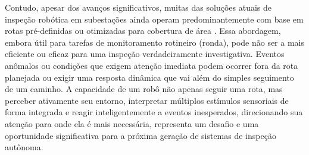 Contudo, apesar dos avanços significativos, muitas das soluções atuais de inspeção robótica em subestações ainda operam predominantemente com base em rotas pré-definidas ou otimizadas para cobertura de área \cite{TJH2b2023Trends}. Essa abordagem, embora útil para tarefas de monitoramento rotineiro (ronda), pode não ser a mais eficiente ou eficaz para uma inspeção verdadeiramente investigativa. Eventos anômalos ou condições que exigem atenção imediata podem ocorrer fora da rota planejada ou exigir uma resposta dinâmica que vai além do simples seguimento de um caminho. A capacidade de um robô não apenas seguir uma rota, mas perceber ativamente seu entorno, interpretar múltiplos estímulos sensoriais de forma integrada e reagir inteligentemente a eventos inesperados, direcionando sua atenção para onde ela é mais necessária, representa um desafio e uma oportunidade significativa para a próxima geração de sistemas de inspeção autônoma.


